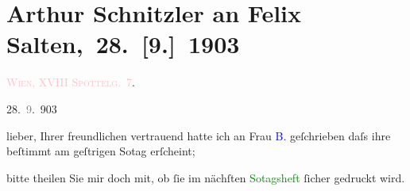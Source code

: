 

\renewcommand{\erwaehntePersonen}{Personen: Emilie Mewes-Béha, Felix Salten}
\renewcommand{\erwaehnteOrte}{Orte: Edmund-Weiß-Gasse 7, Wien, XVIII., Währing}
\renewcommand{\erwaehnteWerke}{Werke: ?? [Journalistenstück], Der Schrei der Liebe. Novelle, Die Zeit, Studie, Unser Geburtstag}
\section[ Arthur Schnitzler an Felix Salten, 28. {[}9.{]} 1903]{Arthur Schnitzler an Felix Salten, 28. {[}9.{]} 1903}
\nopagebreak{}
\rehead{ }\normalsize\beginnumbering{}
\toendnotes[C]{\smallbreak\pagebreak[2]}
\toendnotes[C]{\smallbreak}
\pstart
           \noindent{}\raggedleft{}{\pb}\textsc{\textcolor{pink}{Wien, XVIII}{}\ledrightnote{\textcolor{pink}{XVIII., Währing}}}{ }\textcolor{pink}{\textsc{Spöttelg. 7}}{}\ledrightnote{\textcolor{pink}{Edmund-Weiß-Gasse 7}}. \pend
           
\pstart
           \raggedleft{}28. \textcolor{gray}{9}. 903\pend
           
\pstart
           lieber, Ihrer freundlichen \label{K_L02982-1v}\label{K_L02982-1h} vertrauend hatte ich an Frau \textcolor{blue}{B.}{}\ledrightnote{\textcolor{blue}{Emilie Mewes-Béha}}
               geſchrieben daſs ihre \label{K_L02982-2v}\label{K_L02982-2h} beſtimmt am geſtrigen So{\geminationn}tag erſcheint;\pend
           
\pstart
           bitte theilen Sie mir doch mit, ob ſie im nächſten \textcolor{green}{So{\geminationn}tagsheft}{}\ledrightnote{{$\rightarrow$}\textcolor{green}{Die Zeit}} ſicher gedruckt
               wird.\pend
           
